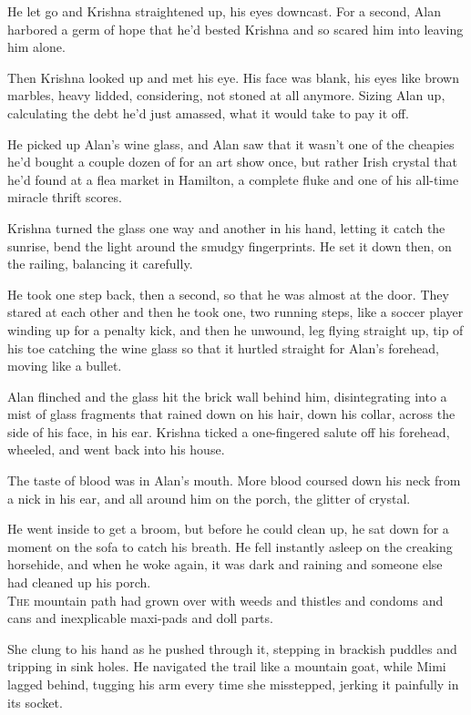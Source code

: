 He let go and Krishna straightened up, his eyes downcast.  For a
second, Alan harbored a germ of hope that he'd bested Krishna and so
scared him into leaving him alone.

Then Krishna looked up and met his eye.  His face was blank, his eyes
like brown marbles, heavy lidded, considering, not stoned at all
anymore.  Sizing Alan up, calculating the debt he'd just amassed, what
it would take to pay it off.

He picked up Alan's wine glass, and Alan saw that it wasn't one of the
cheapies he'd bought a couple dozen of for an art show once, but
rather Irish crystal that he'd found at a flea market in Hamilton, a
complete fluke and one of his all-time miracle thrift scores.

Krishna turned the glass one way and another in his hand, letting it
catch the sunrise, bend the light around the smudgy fingerprints.  He
set it down then, on the railing, balancing it carefully.

He took one step back, then a second, so that he was almost at the
door.  They stared at each other and then he took one, two running
steps, like a soccer player winding up for a penalty kick, and then he
unwound, leg flying straight up, tip of his toe catching the wine
glass so that it hurtled straight for Alan's forehead, moving like a
bullet.

Alan flinched and the glass hit the brick wall behind him,
disintegrating into a mist of glass fragments that rained down on his
hair, down his collar, across the side of his face, in his ear. 
Krishna ticked a one-fingered salute off his forehead, wheeled, and
went back into his house.

The taste of blood was in Alan's mouth.  More blood coursed down his
neck from a nick in his ear, and all around him on the porch, the
glitter of crystal.

He went inside to get a broom, but before he could clean up, he sat
down for a moment on the sofa to catch his breath.  He fell instantly
asleep on the creaking horsehide, and when he woke again, it was dark
and raining and someone else had cleaned up his porch.
\\
\lettrine[lines=3, lhang=.5, nindent=0pt, findent=2pt]{T}{he} mountain path had grown over with weeds and thistles and condoms
and cans and inexplicable maxi-pads and doll parts.

She clung to his hand as he pushed through it, stepping in brackish
puddles and tripping in sink holes.  He navigated the trail like a
mountain goat, while Mimi lagged behind, tugging his arm every time
she misstepped, jerking it painfully in its socket.

